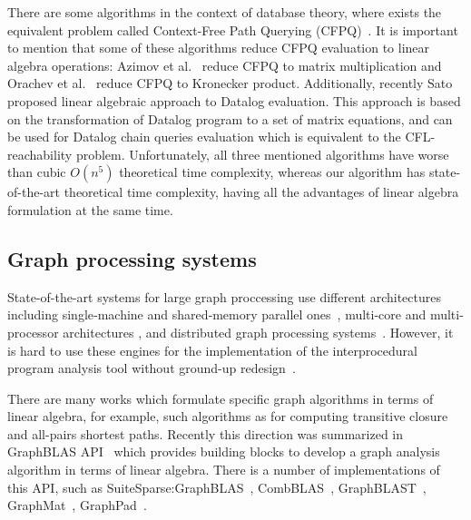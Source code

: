 There are some algorithms in the context of database theory, where exists the equivalent problem called Context-Free Path Querying (CFPQ)~\cite{Azimov:2018:CPQ:3210259.3210264, Grigorev:2017:CPQ:3166094.3166104, hellingsPathQuerying, Medeiros:2018:EEC:3167132.3167265, 10.1007/978-3-030-54832-2_6, 10.1007/978-3-319-91662-0_17, 10.1145/3398682.3399163, 10.1007/978-3-319-41579-6_22}. It is important to mention that some of these algorithms reduce CFPQ evaluation to linear algebra operations: Azimov et al.~\cite{Azimov:2018:CPQ:3210259.3210264} reduce CFPQ to matrix multiplication and Orachev et al.~\cite{10.1007/978-3-030-54832-2_6} reduce CFPQ to Kronecker product. Additionally, recently Sato~\cite{sato_2017} proposed linear algebraic approach to Datalog evaluation. This approach is based on the transformation of Datalog program to a set of matrix equations, and can be used for Datalog chain queries evaluation which is equivalent to the CFL-reachability problem. Unfortunately, all three mentioned algorithms have worse than cubic $O(n^5)$ theoretical time complexity, whereas our algorithm has state-of-the-art theoretical time complexity, having all the advantages of linear algebra formulation at the same time.

\subsection{Graph processing systems}

State-of-the-art systems for large graph proccessing use different architectures including single‑machine and shared‑memory parallel ones~\cite{10.1145/3064176.3064191, 10.1145/2723372.2735369, 10.1145/2442516.2442530, Wang2013AsynchronousLG, 10.1145/2688500.2688507}, multi-core and multi-processor architectures \cite{10.1177/1094342011403516, Gregor2005ThePB, 6569865}, and distributed graph processing systems~\cite{ 10.1145/3087556.3087580, 10.1145/2621934.2621936, Jia2017ADM, Khorasani2014CuShaVG, 10.14778/2212351.2212354, 10.1145/2517349.2522740, Sengupta2016GraphInAO, 10.1145/3016078.2851145, Yan2018GraphDDV, 10.5555/1863103.1863113}. However, it is hard to use these engines for the implementation of the interprocedural program analysis tool without ground-up redesign~\cite{10.1145/3037697.3037744}.

There are many works which formulate specific graph algorithms in terms of linear algebra, for example, such algorithms as for computing transitive closure and all-pairs shortest paths.
Recently this direction was summarized in GraphBLAS API~\cite{7761646} which provides building blocks to develop a graph analysis algorithm in terms of linear algebra.
There is a number of implementations of this API, such as SuiteSparse:GraphBLAS~\cite{10.1145/3322125}, CombBLAS~\cite{10.1177/1094342011403516}, GraphBLAST~\cite{yang2019graphblast}, GraphMat~\cite{10.14778/2809974.2809983}, GraphPad~\cite{7516027}. 


